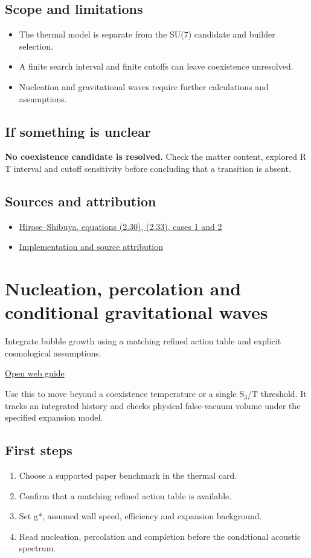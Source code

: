 \documentclass[11pt,a4paper]{article}
\begin{document}
\subsection*{Scope and limitations}
\begin{itemize}
\item The thermal model is separate from the SU(7) candidate and builder selection.
\item A finite search interval and finite cutoffs can leave coexistence unresolved.
\item Nucleation and gravitational waves require further calculations and assumptions.
\end{itemize}
\subsection*{If something is unclear}
\textbf{No coexistence candidate is resolved.} Check the matter content, explored R T interval and cutoff sensitivity before concluding that a transition is absent.

\subsection*{Sources and attribution}
\begin{itemize}
\item \href{https://arxiv.org/abs/2303.14192}{Hirose--Shibuya, equations (2.30), (2.33), cases 1 and 2}
\item \href{https://github.com/karlesmarin/ghu-lab/blob/main/src/modules/thermal_ghu.mjs}{Implementation and source attribution}
\end{itemize}
\section{Nucleation, percolation and conditional gravitational waves}
Integrate bubble growth using a matching refined action table and explicit cosmological assumptions.

\href{https://karlesmarin.github.io/ghu-explorer/guide/thermalhistory/index.html}{Open web guide}

Use this to move beyond a coexistence temperature or a single S\ensuremath{{}_{3}}/T threshold. It tracks an integrated history and checks physical false-vacuum volume under the specified expansion model.
\subsection*{First steps}
\begin{enumerate}
\item Choose a supported paper benchmark in the thermal card.
\item Confirm that a matching refined action table is available.
\item Set g*, assumed wall speed, efficiency and expansion background.
\item Read nucleation, percolation and completion before the conditional acoustic spectrum.
\end{enumerate}
\end{document}

